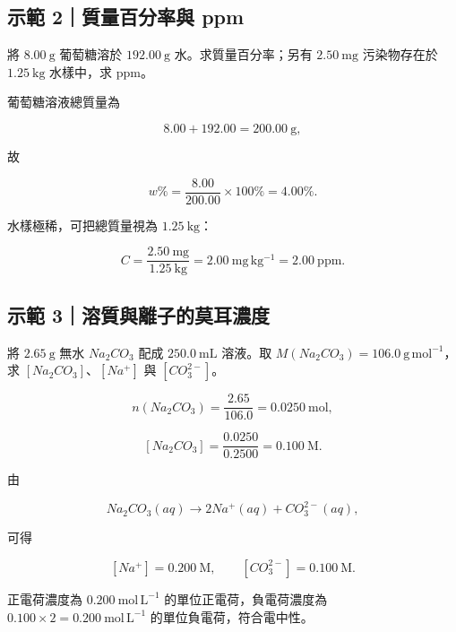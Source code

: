 \documentclass[11pt,a4paper]{article}
\begin{document}
\begin{HandoutWorkedExample}

\subsection{示範 2｜質量百分率與 ppm}\label{ux793aux7bc4-2ux8ceaux91cfux767eux5206ux7387ux8207-ppm}

將 \(8.00\ \mathrm g\) 葡萄糖溶於 \(192.00\ \mathrm g\) 水。求質量百分率；另有 \(2.50\ \mathrm{mg}\) 污染物存在於 \(1.25\ \mathrm{kg}\) 水樣中，求 ppm。

葡萄糖溶液總質量為

\[
8.00+192.00=200.00\ \mathrm g,
\]

故

\[
w\%=\frac{8.00}{200.00}\times100\%=4.00\%.
\]

水樣極稀，可把總質量視為 \(1.25\ \mathrm{kg}\)：

\[
C=\frac{2.50\ \mathrm{mg}}{1.25\ \mathrm{kg}}=2.00\ \mathrm{mg\,kg^{-1}}=2.00\ \mathrm{ppm}.
\]

\end{HandoutWorkedExample}

\begin{HandoutWorkedExample}

\subsection{示範 3｜溶質與離子的莫耳濃度}\label{ux793aux7bc4-3ux6eb6ux8ceaux8207ux96e2ux5b50ux7684ux83abux8033ux6fc3ux5ea6}

將 \(2.65\ \mathrm g\) 無水 \(Na_2CO_3\) 配成 \(250.0\ \mathrm{mL}\) 溶液。取 \(M(Na_2CO_3)=106.0\ \mathrm{g\,mol^{-1}}\)，求 \([Na_2CO_3]\)、\([Na^+]\) 與 \([CO_3^{2-}]\)。

\[
n(Na_2CO_3)=\frac{2.65}{106.0}=0.0250\ \mathrm{mol},
\]

\[
[Na_2CO_3]=\frac{0.0250}{0.2500}=0.100\ \mathrm M.
\]

由

\[
Na_2CO_3(aq)\rightarrow2Na^+(aq)+CO_3^{2-}(aq),
\]

可得

\[
[Na^+]=0.200\ \mathrm M,\qquad[CO_3^{2-}]=0.100\ \mathrm M.
\]

正電荷濃度為 \(0.200\ \mathrm{mol\,L^{-1}}\) 的單位正電荷，負電荷濃度為 \(0.100\times2=0.200\ \mathrm{mol\,L^{-1}}\) 的單位負電荷，符合電中性。

\end{HandoutWorkedExample}
\end{document}
